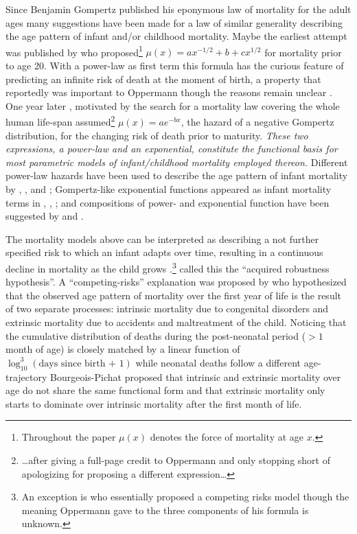 \documentclass[smallextended]{svjour3} %
\begin{document}
Since Benjamin Gompertz published his eponymous law of mortality for the
adult ages many suggestions have been made for a law of similar
generality describing the age pattern of infant and/or childhood
mortality. Maybe the earliest attempt was published by
\citet{Oppermann1870} who proposed\footnote{Throughout the paper
  \(\mu(x)\) denotes the force of mortality at age \(x\).}
\(\mu(x)=ax^{-1/2}+b+cx^{1/2}\) for mortality prior to age 20. With a
power-law as first term this formula has the curious feature of
predicting an infinite risk of death at the moment of birth, a property
that reportedly was important to Oppermann though the reasons remain
unclear \citep{Steffensen1930}. One year later \citet{Thiele1871},
motivated by the search for a mortality law covering the whole human
life-span assumed\footnote{\ldots{}after giving a full-page credit to
  Oppermann and only stopping short of apologizing for proposing a
  different expression\ldots{}} \(\mu(x) = ae^{-bx}\), the hazard of a
negative Gompertz distribution, for the changing risk of death prior to
maturity. \emph{These two expressions, a power-law and an exponential,
constitute the functional basis for most parametric models of
infant/childhood mortality employed thereon.} Different power-law
hazards have been used to describe the age pattern of infant mortality
by \citet{Brillinger1961}, \citet{Choe1981}, \citet{DeBeer2016} and
\citet{Berrut2016}; Gompertz-like exponential functions appeared as
infant mortality terms in \citet{Siler1979}, \citet{Mode1982},
\citet{Rogers1994}; and compositions of power- and exponential function
have been suggested by \citet{Wittstein1883} and \citet{Heligman1980}.

The mortality models above can be interpreted as describing a not
further specified risk to which an infant adapts over time, resulting in
a continuous decline in mortality as the child grows \citep[as
explicitly stated by][]{Siler1979, Heligman1980}.\footnote{An exception
  is \citet{Oppermann1870} who essentially proposed a competing risks
  model though the meaning Oppermann gave to the three components of his
  formula is unknown.} \citet{Levitis2011} called this the ``acquired
robustness hypothesis''. A ``competing-risks'' explanation was proposed
by \citet{Bourgeois-Pichat1951} who hypothesized that the observed age
pattern of mortality over the first year of life is the result of two
separate processes: intrinsic mortality due to congenital disorders and
extrinsic mortality due to accidents and maltreatment of the child.
Noticing that the cumulative distribution of deaths during the
post-neonatal period (\(>1\) month of age) is closely matched by a
linear function of \(\log_{10}^3(\text{days since birth + 1})\) while
neonatal deaths follow a different age-trajectory Bourgeois-Pichat
proposed that intrinsic and extrinsic mortality over age do not share
the same functional form and that extrinsic mortality only starts to
dominate over intrinsic mortality after the first month of life.
\end{document}
